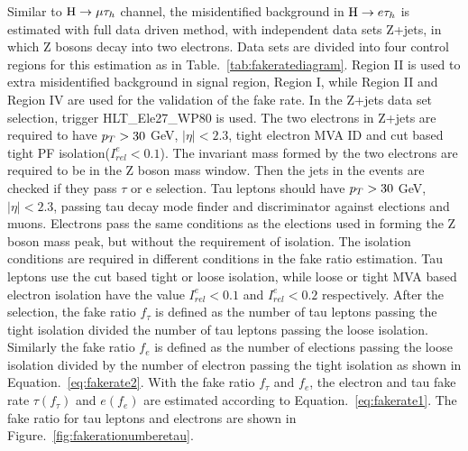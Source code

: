 Similar to $\mathrm{H}\to \mu\tau_{h}$ channel, the misidentified background in $\mathrm{H} \to e \tau_{h}$ is estimated with full data driven method, with independent data sets Z+jets, in which Z bosons decay into two electrons.  Data sets are divided into four control regions for this estimation as in Table.~\ref{tab:fakeratediagram}. Region II is used to extra misidentified background in signal region, Region I, while Region II and Region IV are used for the validation of the fake rate. In the Z+jets data set selection, trigger HLT\_Ele27\_WP80 is used. The two electrons in Z+jets are required to have $p_{T}>30$ GeV, $|\eta|<2.3$, tight electron MVA ID and cut based tight PF isolation($I^{e}_{rel}<0.1$). The invariant mass formed by the two electrons are required to be in the Z boson mass window. Then the jets in the events are checked if they pass $\tau$ or e selection. Tau leptons should have $p_{T}>30$ GeV, $|\eta|<2.3$, passing tau decay mode finder and discriminator against elections and muons. Electrons pass the same conditions as the elections used in forming the Z boson mass peak, but without the requirement of isolation.  The isolation conditions are required in different conditions in the fake ratio estimation. Tau leptons use the cut based tight or loose isolation, while loose or tight MVA based electron isolation have the value $I^{e}_{rel}<0.1$ and $I^{e}_{rel}<0.2$ respectively. After the selection, the fake ratio $f_{\tau}$ is defined as the number of tau leptons passing the tight isolation divided the number of tau leptons passing the loose isolation. Similarly the fake ratio $f_{e}$ is defined as the number of elections passing the loose isolation divided by the number of electron passing the tight isolation as shown in Equation.~\ref{eq:fakerate2}. With the fake ratio $f_{\tau}$ and  $f_{e}$, the electron and tau fake rate $\tau(f_{\tau})$ and $e(f_{e})$ are estimated according to Equation.~\ref{eq:fakerate1}. The fake ratio for tau leptons and electrons are shown in Figure.~\ref{fig:fakerationumberetau}. 

